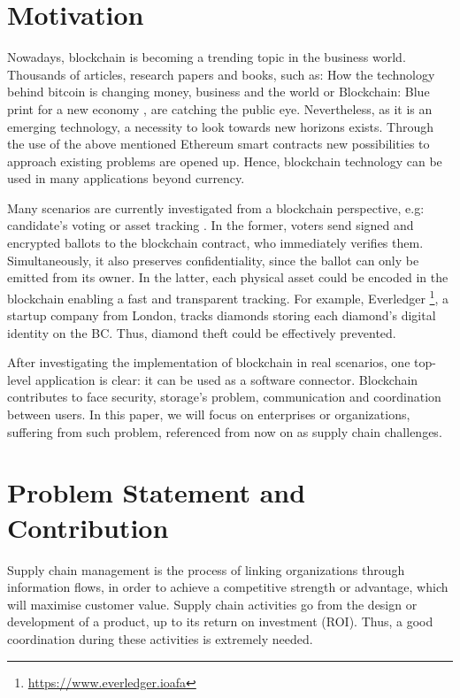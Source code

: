 \section{Motivation}

Nowadays, blockchain is becoming a trending topic in the business world. Thousands of articles, research papers and books, such as: How the technology behind bitcoin is changing money, business and the world \cite{tapscott2016blockchain} or Blockchain: Blue print for a new economy \cite{swan2015blockchain}, are catching the public eye. Nevertheless, as it is an emerging technology, a necessity to look towards new horizons exists. Through the use of the above mentioned Ethereum smart contracts new possibilities to approach existing problems are opened up. Hence, blockchain technology can be used in many applications beyond currency.

Many scenarios are currently investigated from a blockchain perspective, e.g: candidate's voting or asset tracking \cite{abeyratne2016blockchain}. In the former, voters send signed and encrypted ballots to the blockchain contract, who immediately verifies them. Simultaneously, it also preserves confidentiality, since the ballot can only be emitted from its owner. In the latter, each physical asset could be encoded in the blockchain enabling a fast and transparent tracking. For example, Everledger \footnote{\url{https://www.everledger.ioafa}}, a startup company from London, tracks diamonds storing each diamond's digital identity on the BC. Thus, diamond theft could be effectively prevented.

After investigating the implementation of blockchain in real scenarios, one top-level application is clear: it can be used as a software connector. Blockchain contributes to face security, storage's problem, communication and coordination between users. In this paper, we will focus on enterprises or organizations, suffering from such problem, referenced from now on as supply chain challenges.

\section{Problem Statement and Contribution}

Supply chain management is the process of linking organizations through information flows, in order to achieve a competitive strength or advantage, which will maximise customer value. Supply chain activities go from the design or development of a product, up to its return on investment (ROI). Thus, a good coordination during these activities is extremely needed.

